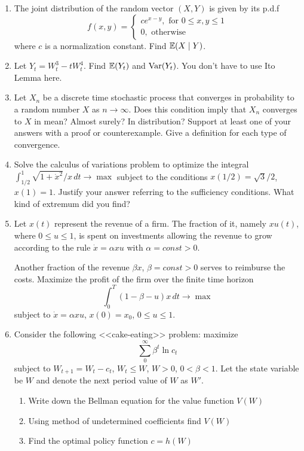 \documentclass[pdftex,12pt,a4paper]{article}
\begin{document}
\begin{enumerate}
\item  The joint distribution of the random vector $(X,Y)$ is given by its p.d.f 
\[
f(x,y)=
\left\{
  \begin{array}{l}
    c e^{x-y}, \text{ for } 0\leq x,y\leq 1 \\
    0, \text{ otherwise}    
  \end{array}
\right.
\]
where $c$ is a normalization constant. Find $\mathbb{E}(X\mid Y)$.

\item Let $Y_t=W_t^3-tW_t^4$. Find $\mathbb{E}(Y_t)$ and $\operatorname{Var}(Y_t)$.  You don’t have to use Ito Lemma here.
\item Let $X_n$ be a discrete time stochastic process that converges in probability to a random number $X$ as $n\to \infty$. Does this condition imply that $X_n$ converges to $X$ in mean? Almost surely? In distribution? Support at least one of your answers with a proof or counterexample. Give a definition for each type of convergence. 

\item Solve the calculus of variations problem to optimize the integral 
$ \int_{1/2}^1 \sqrt{1+\dot{x}^2}/x\,dt \to \max $
subject to the conditions $x(1/2)=\sqrt{3}/2$, $x(1)=1$. Justify your answer referring to the sufficiency conditions. What kind of extremum did you find?

\item Let $x(t)$ represent the revenue of a firm. The fraction of it, namely $xu(t)$, where $0\leq u\leq 1$, is spent on investments allowing the revenue to grow according to the rule $\dot{x}=\alpha x u$ with $\alpha=const>0$. 

Another fraction of the revenue $\beta x$, $\beta=const>0$ serves to reimburse the costs. Maximize the profit of the firm over the finite time horizon
\[
\int_0^T (1-\beta-u)x\, dt \to \max
\]
subject to $\dot{x}=\alpha x u$, $x(0)=x_0$, $0\leq u\leq 1$.

\item Consider the following <<cake-eating>> problem: maximize 
\[
\sum_0^{\infty} \beta^t \ln c_t
\]
subject to $W_{t+1}=W_t-c_t$, $W_t\leq W$, $W>0$, $0<\beta<1$. Let the state variable be $W$ and denote the next period value of $W$ as $W'$. 
\begin{enumerate}
\item Write down the Bellman equation for the value function $V(W)$
\item Using method of undetermined coefficients find $V(W)$
\item Find the optimal policy function $c=h(W)$
\end{enumerate}

\end{enumerate}
\end{document}
